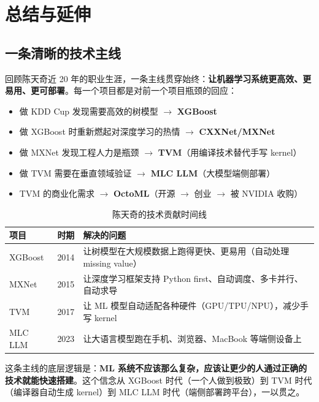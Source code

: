 \documentclass[a4paper]{article}
\begin{document}
\section{总结与延伸}

\subsection{一条清晰的技术主线}

回顾陈天奇近 20 年的职业生涯，一条主线贯穿始终：\textbf{让机器学习系统更高效、更易用、更可部署}。每一个项目都是对前一个项目瓶颈的回应：

\begin{itemize}
    \item 做 KDD Cup 发现需要高效的树模型 $\rightarrow$ \textbf{XGBoost}
    \item 做 XGBoost 时重新燃起对深度学习的热情 $\rightarrow$ \textbf{CXXNet/MXNet}
    \item 做 MXNet 发现工程人力是瓶颈 $\rightarrow$ \textbf{TVM}（用编译技术替代手写 kernel）
    \item 做 TVM 需要在垂直领域验证 $\rightarrow$ \textbf{MLC LLM}（大模型端侧部署）
    \item TVM 的商业化需求 $\rightarrow$ \textbf{OctoML}（开源 $\rightarrow$ 创业 $\rightarrow$ 被 NVIDIA 收购）
\end{itemize}

\begin{table}[H]
\centering
\begin{tabular}{p{2.2cm}p{1.8cm}p{9cm}}
\toprule
\textbf{项目} & \textbf{时期} & \textbf{解决的问题} \\
\midrule
XGBoost & 2014 & 让树模型在大规模数据上跑得更快、更易用（自动处理 missing value） \\
MXNet & 2015 & 让深度学习框架支持 Python first、自动调度、多卡并行、自动求导 \\
TVM & 2017 & 让 ML 模型自动适配各种硬件（GPU/TPU/NPU），减少手写 kernel \\
MLC LLM & 2023 & 让大语言模型跑在手机、浏览器、MacBook 等端侧设备上 \\
\bottomrule
\end{tabular}
\caption{陈天奇的技术贡献时间线}
\end{table}

这条主线的底层逻辑是：\textbf{ML 系统不应该那么复杂，应该让更少的人通过正确的技术就能快速搭建}。这个信念从 XGBoost 时代（一个人做到极致）到 TVM 时代（编译器自动生成 kernel）到 MLC LLM 时代（端侧部署跨平台），一以贯之。
\end{document}

